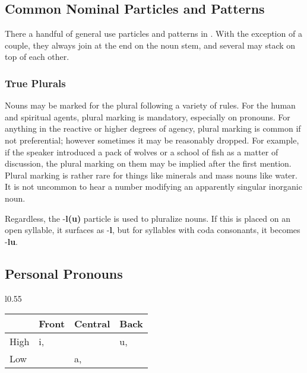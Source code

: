 \subsection{Common Nominal Particles and Patterns}
There a handful of general use particles and patterns in \langname. With the exception of a couple, they always join at the end on the noun stem, and several may stack on top of each other.
  \subsubsection{True Plurals}
  Nouns may be marked for the plural following a variety of rules. For the human and spiritual agents, plural marking is mandatory, especially on pronouns. For anything in the reactive or higher degrees of agency, plural marking is common if not preferential; however sometimes it may be reasonably dropped. For example, if the speaker introduced a pack of wolves or a school of fish as a matter of discussion, the plural marking on them may be implied after the first mention. Plural marking is rather rare for things like minerals and mass nouns like water. It is not uncommon to hear a number modifying an apparently singular inorganic noun.\par
  Regardless, the -\textbf{l(u)} particle is used to pluralize nouns. If this is placed on an open syllable, it surfaces as -\textbf{l}, but for syllables with coda consonants, it becomes -\textbf{lu}.

\subsection{Personal Pronouns}
  \begin{wrapfigure}{l}{0.55\textwidth}
    \begin{tabular}{|l|l|l|l|}
      \hline
              & Front              & Central            & Back               \\ \hline \hline
      High    & i,  &                    & u,  \\
      Low     &                    & a,  &                    \\ \hline
    \end{tabular}
  \end{wrapfigure}
